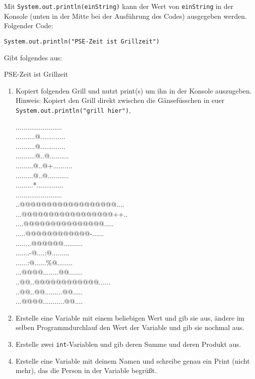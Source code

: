 \documentclass{../../sheet}
\begin{document}
Mit \texttt{System.out.println(einString)} kann der Wert von \texttt{einString} in der Konsole (unten in der Mitte bei der Ausführung des Codes) ausgegeben werden. Folgender Code:
\begin{verbatim}
System.out.println("PSE-Zeit ist Grillzeit")
\end{verbatim}
Gibt folgendes aus:
\begin{ausgabe}
  PSE-Zeit ist Grillzeit
\end{ausgabe}

\begin{enumerate}
    \item Kopiert folgenden Grill und nutzt print(s) um ihn in der Konsole auszugeben.\\
    Hinweis: Kopiert den Grill direkt zwischen die Gänsefüsschen in euer \\\texttt{System.out.println("grill hier")},  
          \begin{ausgabe}
........................\\
..........@.............\\
..........@.............\\
..........@..@..........\\
.........@..@+..........\\
.........@..@...........\\
.........*..............\\
........................\\
..@@@@@@@@@@@@@@@@@@....\\
...@@@@@@@@@@@@@@@@@++..\\
....@@@@@@@@@@@@@@@.....\\
.....@@@@@@@@@@@@-......\\
........@@@@@@..........\\
.......-@....:@.........\\
......:@......\%@........\\
...@@@@........@@.......\\
..@@..@@@@@@@@@@@@......\\
..@@..@@.........@@.....\\
...@@@@...........@@....
          \end{ausgabe}
    \item Erstelle eine Variable mit einem beliebigen Wert und gib sie aus, ändere im selben Programmdurchlauf den Wert der Variable und gib sie nochmal aus.
    \item Erstelle zwei \texttt{int}-Variablen und gib deren Summe und deren Produkt aus.
    \item Erstelle eine Variable mit deinem Namen und schreibe genau ein Print (nicht mehr), das die Person in der Variable begrüßt.
\end{enumerate}
\end{document}
